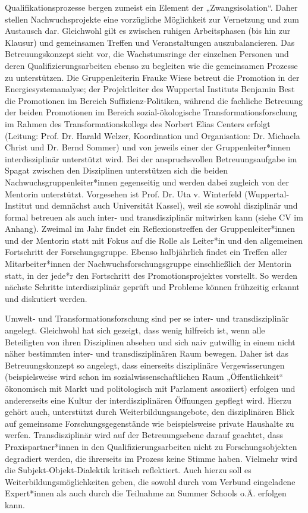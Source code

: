 \documentclass[a4paper,11pt,twoside]{scrartcl}
\begin{document}
Qualifikationsprozesse bergen zumeist ein Element der „Zwangsisolation“. Daher stellen Nachwuchsprojekte eine vorzügliche Möglichkeit zur Vernetzung und zum Austausch dar. Gleichwohl gilt es zwischen ruhigen Arbeitsphasen (bis hin zur Klausur) und gemeinsamen Treffen und Veranstaltungen auszubalancieren. Das Betreuungskonzept sieht vor, die Wachstumsringe der einzelnen Personen und deren Qualifizierungsarbeiten ebenso zu begleiten wie die gemeinsamen Prozesse zu unterstützen.
Die Gruppenleiterin Frauke Wiese betreut die Promotion in der Energiesystemanalyse; der Projektleiter des Wuppertal Instituts Benjamin Best die Promotionen im Bereich Suffizienz-Politiken, während die fachliche Betreuung der beiden Promotionen im Bereich sozial-ökologische Transformationsforschung im Rahmen des Transformationskollegs des Norbert Elias Centers erfolgt (Leitung: Prof. Dr. Harald Welzer, Koordination und Organisation: Dr. Michaela Christ und Dr. Bernd Sommer) und von jeweils einer der Gruppenleiter*innen interdisziplinär unterstützt wird. Bei der anspruchsvollen Betreuungsaufgabe im Spagat zwischen den Disziplinen unterstützen sich die beiden Nachwuchsgruppenleiter*innen gegenseitig und werden dabei zugleich von der Mentorin unterstützt. Vorgesehen ist Prof. Dr. Uta v. Winterfeld (Wuppertal-Institut und demnächst auch Universität Kassel), weil sie sowohl disziplinär und formal betreuen als auch inter- und transdisziplinär mitwirken kann (siehe CV im Anhang). Zweimal im Jahr findet ein Reflexionstreffen der Gruppenleiter*innen und der Mentorin statt mit Fokus auf die Rolle als Leiter*in und den allgemeinen Fortschritt der Forschungsgruppe. Ebenso halbjährlich findet ein Treffen aller Mitarbeiter*innen der Nachwuchsforschungsgruppe einschließlich der Mentorin statt, in der jede*r den Fortschritt des Promotionsprojektes vorstellt. So werden nächste Schritte interdisziplinär geprüft und Probleme können frühzeitig erkannt und diskutiert werden.

Umwelt- und Transformationsforschung sind per se inter- und transdisziplinär angelegt. Gleichwohl hat sich gezeigt, dass wenig hilfreich ist, wenn alle Beteiligten von ihren Disziplinen absehen und sich naiv gutwillig in einem nicht näher bestimmten inter- und transdisziplinären Raum bewegen. Daher ist das Betreuungskonzept so angelegt, dass einerseits disziplinäre Vergewisserungen (beispielsweise wird schon im sozialwissenschaftlichen Raum „Öffentlichkeit“ ökonomisch mit Markt und politologisch mit Parlament assoziiert) erfolgen und andererseits eine Kultur der interdisziplinären Öffnungen gepflegt wird. Hierzu gehört auch, unterstützt durch Weiterbildungsangebote, den disziplinären Blick auf gemeinsame Forschungsgegenstände wie beispielsweise private Haushalte zu werfen. Transdisziplinär wird auf der Betreuungsebene darauf geachtet, dass Praxispartner*innen in den Qualifizierungsarbeiten nicht zu Forschungsobjekten degradiert werden, die ihrerseits im Prozess keine Stimme haben. Vielmehr wird die Subjekt-Objekt-Dialektik kritisch reflektiert. Auch hierzu soll es Weiterbildungsmöglichkeiten geben, die sowohl durch vom Verbund eingeladene Expert*innen als auch durch die Teilnahme an Summer Schools o.Ä. erfolgen kann. 
\end{document}
